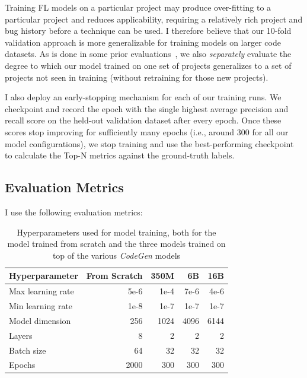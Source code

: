 \documentclass[12pt,openany,oneside,table]{cmuthesis}
\begin{document}
    Training FL models on a particular project may produce over-fitting to a particular project and reduces applicability, requiring a relatively rich project and bug history before a technique can be used.  I therefore believe that our 10-fold validation approach is more generalizable for training models on larger code datasets. 
    As is done in some prior evaluations~\cite{li2019deepfl,li2021fault}, we also \emph{separately} evaluate the degree to which our model trained on one set of projects generalizes to a set of projects not seen in training (without retraining for those new projects).
    
    I also deploy an early-stopping mechanism for each of our training runs. We checkpoint and record the epoch with the single highest average precision and recall score on the held-out validation dataset after every epoch. Once these scores stop improving for sufficiently many epochs (i.e., around 300 for all our model configurations), we stop training and use the best-performing checkpoint to calculate the Top-N metrics against the ground-truth labels.
    
    \subsection{Evaluation Metrics} I use the following evaluation metrics:

    
    \begin{table}[t]
    \centering
    \caption{\small Hyperparameters used for model training, both for the model trained from scratch and the three models trained on top of the various \textit{CodeGen} models}
    \begin{tabular}{l|rrrr}
    \toprule
    \textbf{Hyperparameter} & \textbf{From Scratch} & \textbf{350M} & \textbf{6B} & \textbf{16B}\\
    \midrule
    Max learning rate  &  5e-6 & 1e-4 & 7e-6 & 4e-6\\
    Min learning rate  &  1e-8 & 1e-7 & 1e-7 & 1e-7\\
    Model dimension & 256 & 1024 & 4096 & 6144\\
    Layers  &  8 & 2 & 2 & 2\\
    Batch size & 64 & 32 & 32 & 32\\
    Epochs & 2000 & 300 & 300 & 300\\
    \bottomrule
    \end{tabular}
    \label{table:hyperparams}
    \end{table}
    
\end{document}
